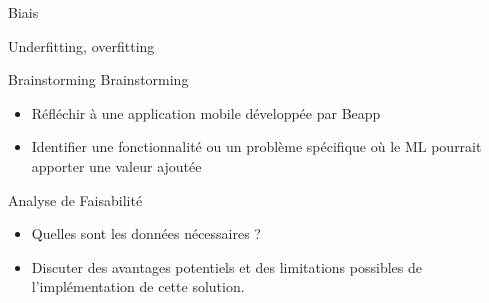 \begin{frame}{Biais}
\end{frame}

\begin{frame}{Underfitting, overfitting}
\end{frame}


\begin{frame}{Brainstorming}
  Brainstorming
  \begin{itemize}
  \item Réfléchir à une application mobile développée par Beapp
  \item Identifier une fonctionnalité ou un problème spécifique où le
    ML pourrait apporter une valeur ajoutée
  \end{itemize}

  Analyse de Faisabilité
  \begin{itemize}
  \item Quelles sont les données nécessaires ?
  \item Discuter des avantages potentiels et des limitations possibles
    de l'implémentation de cette solution.
  \end{itemize}
\end{frame}


